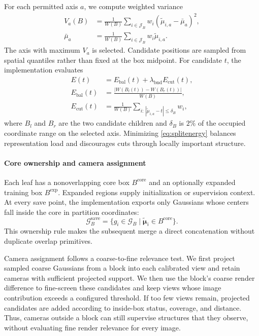 \documentclass[conference]{IEEEtran}
\begin{document}
For each permitted axis $a$, we compute weighted variance
\begin{align}
V_a(B)&=\frac{1}{W(B)}\sum_{i\in\mathcal{J}_B}w_i
\left(\tilde{\mu}_{i,a}-\bar{\mu}_a\right)^2,\nonumber\\
\bar{\mu}_a&=\frac{1}{W(B)}\sum_{i\in\mathcal{J}_B}w_i\tilde{\mu}_{i,a}.
\label{eq:weightedvariance}
\end{align}
The axis with maximum $V_a$ is selected. Candidate positions are sampled from spatial quantiles rather than fixed at the box midpoint. For candidate $t$, the implementation evaluates
\begin{align}
E(t)&=E_{\mathrm{bal}}(t)+\lambda_{\mathrm{bnd}}E_{\mathrm{cut}}(t),\label{eq:splitenergy}\\
E_{\mathrm{bal}}(t)&=\frac{|W(B_l(t))-W(B_r(t))|}{W(B)},\nonumber\\
E_{\mathrm{cut}}(t)&=\frac{1}{W(B)}\sum_{i:\,|\tilde{\mu}_{i,a}-t|\leq\delta_B}w_i,\nonumber
\end{align}
where $B_l$ and $B_r$ are the two candidate children and $\delta_B$ is $2\%$ of the occupied coordinate range on the selected axis. Minimizing \eqref{eq:splitenergy} balances representation load and discourages cuts through locally important structure.

\paragraph{Core ownership and camera assignment}
Each leaf has a nonoverlapping core box $B^{\mathrm{core}}$ and an optionally expanded training box $B^{\mathrm{exp}}$. Expanded regions supply initialization or supervision context. At every save point, the implementation exports only Gaussians whose centers fall inside the core in partition coordinates:
\begin{equation}
\mathcal{G}^{\mathrm{save}}_B=\{g_i\in\mathcal{G}_B\mid
\tilde{\boldsymbol{\mu}}_i\in B^{\mathrm{core}}\}.
\label{eq:coreexport}
\end{equation}
This ownership rule makes the subsequent merge a direct concatenation without duplicate overlap primitives.

Camera assignment follows a coarse-to-fine relevance test. We first project sampled coarse Gaussians from a block into each calibrated view and retain cameras with sufficient projected support. We then use the block's coarse render difference to fine-screen these candidates and keep views whose image contribution exceeds a configured threshold. If too few views remain, projected candidates are added according to inside-box status, coverage, and distance. Thus, cameras outside a block can still supervise structures that they observe, without evaluating fine render relevance for every image.
\end{document}
